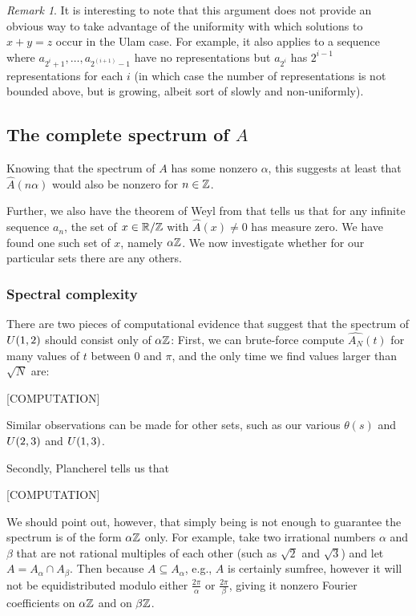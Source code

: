\documentclass{article}
\theoremstyle{definition}
\theoremstyle{remark}
\newtheorem{remark}{Remark}
\numberwithin{equation}{section}
\begin{document}
\begin{remark}
  It is interesting to note that this argument does not provide an
  obvious way to take advantage of the uniformity with which solutions
  to $x+y=z$ occur in the Ulam case.  For example, it also applies to
  a sequence where $a_{2^i+1}, \ldots, a_{2^(i+1)-1}$ have no
  representations but $a_{2^i}$ has $2^{i-1}$ representations for each
  $i$ (in which case the number of representations is not bounded
  above, but is growing, albeit sort of slowly and non-uniformly).
\end{remark}

\subsection{The complete spectrum of $A$}

Knowing that the spectrum of $A$ has some nonzero $\alpha$, this
suggests at least that $\widehat{A}(n\alpha)$ would also be nonzero
for $n \in \mathbb{Z}$.  

Further, we also have the theorem of Weyl from \cite{weyl:ann1916}
that tells us that for any infinite sequence $a_n$, the set of
$x \in \mathbb{R}/\mathbb{Z}$ with $\widehat{A}(x) \neq 0$ has measure zero.  We have
found one such set of $x$, namely $\alpha\mathbb{Z}$.  We now investigate
whether for our particular \relevant sets there are any others.

\subsubsection{Spectral complexity}

There are two pieces of computational evidence that suggest that the
spectrum of $U(1,2)$ should consist only of $\alpha\mathbb{Z}$: First, we
can brute-force compute $\widehat{A_N}(t)$ for many values of $t$
between 0 and $\pi$, and the only time we find values larger than
$\sqrt{N}$ are: 

[COMPUTATION]

Similar observations can be made for other \relevant sets, such as our
various $\theta(s)$ and $U(2,3)$ and $U(1,3)$.  

Secondly, Plancherel tells us that 

[COMPUTATION]

We should point out, however, that simply being \relevant is not enough
to guarantee the spectrum is of the form $\alpha\mathbb{Z}$ only.  For
example, take two irrational numbers $\alpha$ and $\beta$ that are not
rational multiples of each other (such as $\sqrt2$ and $\sqrt3$) and
let $A = A_\alpha \cap A_\beta$.  Then because $A \subseteq A_\alpha$,
e.g., $A$ is certainly sumfree, however it will not be equidistributed
modulo either $\frac{2\pi}{\alpha}$ or $\frac{2\pi}{\beta}$, giving it
nonzero Fourier coefficients on $\alpha\mathbb{Z}$ and on $\beta\mathbb{Z}$.  
\end{document}

